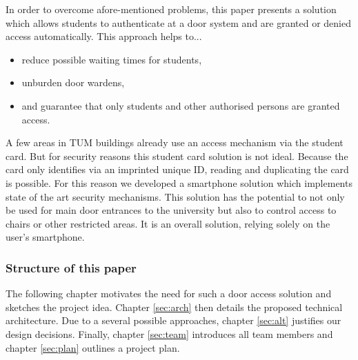 In order to overcome afore-mentioned problems, this paper presents a solution which allows students to authenticate at a door system and are granted or denied access automatically. This approach helps to...

\begin{itemize}
\item reduce possible waiting times for students,
\item unburden door wardens,
\item and guarantee that only students and other authorised persons are granted access.
\end{itemize}

A few areas in TUM buildings already use an access mechanism via the student card.
But for security reasons this student card solution is not ideal.
Because the card only identifies via an imprinted unique ID, reading and duplicating the card is possible.
For this reason we developed a smartphone solution which implements state of the art security mechanisms.
This solution has the potential to not only be used for main door entrances to the university but also to control access to chairs or other restricted areas.
It is an overall solution, relying solely on the user's smartphone.
 
 \subsubsection*{Structure of this paper}

The following chapter motivates the need for such a door access solution and sketches the project idea. Chapter \ref{sec:arch} then details the proposed technical architecture. Due to a several possible approaches, chapter \ref{sec:alt} justifies our design decisions. Finally, chapter \ref{sec:team} introduces all team members and chapter \ref{sec:plan} outlines a project plan. 
